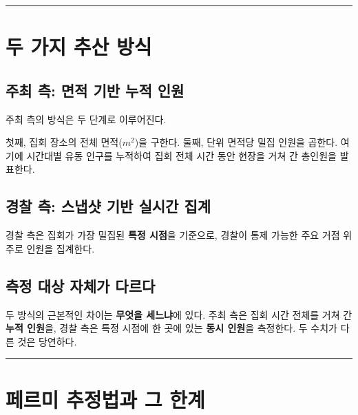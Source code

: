 \documentclass[
  letterpaper,
  DIV=11,
  numbers=noendperiod]{scrreprt}
\begin{document}
\begin{center}\rule{0.5\linewidth}{0.5pt}\end{center}

\section{두 가지 추산
방식}\label{uxb450-uxac00uxc9c0-uxcd94uxc0b0-uxbc29uxc2dd}

\subsection{주최 측: 면적 기반 누적
인원}\label{uxc8fcuxcd5c-uxce21-uxba74uxc801-uxae30uxbc18-uxb204uxc801-uxc778uxc6d0}

주최 측의 방식은 두 단계로 이루어진다.

첫째, 집회 장소의 전체 면적(\(m^2\))을 구한다. 둘째, 단위 면적당 밀집
인원을 곱한다. 여기에 시간대별 유동 인구를 누적하여 집회 전체 시간 동안
현장을 거쳐 간 총인원을 발표한다.

\subsection{경찰 측: 스냅샷 기반 실시간
집계}\label{uxacbduxcc30-uxce21-uxc2a4uxb0c5uxc0f7-uxae30uxbc18-uxc2e4uxc2dcuxac04-uxc9d1uxacc4}

경찰 측은 집회가 가장 밀집된 \textbf{특정 시점}을 기준으로, 경찰이 통제
가능한 주요 거점 위주로 인원을 집계한다.

\subsection{측정 대상 자체가
다르다}\label{uxce21uxc815-uxb300uxc0c1-uxc790uxccb4uxac00-uxb2e4uxb974uxb2e4}

두 방식의 근본적인 차이는 \textbf{무엇을 세느냐}에 있다. 주최 측은 집회
시간 전체를 거쳐 간 \textbf{누적 인원}을, 경찰 측은 특정 시점에 한 곳에
있는 \textbf{동시 인원}을 측정한다. 두 수치가 다른 것은 당연하다.

\begin{center}\rule{0.5\linewidth}{0.5pt}\end{center}

\section{페르미 추정법과 그
한계}\label{uxd398uxb974uxbbf8-uxcd94uxc815uxbc95uxacfc-uxadf8-uxd55cuxacc4}
\end{document}
